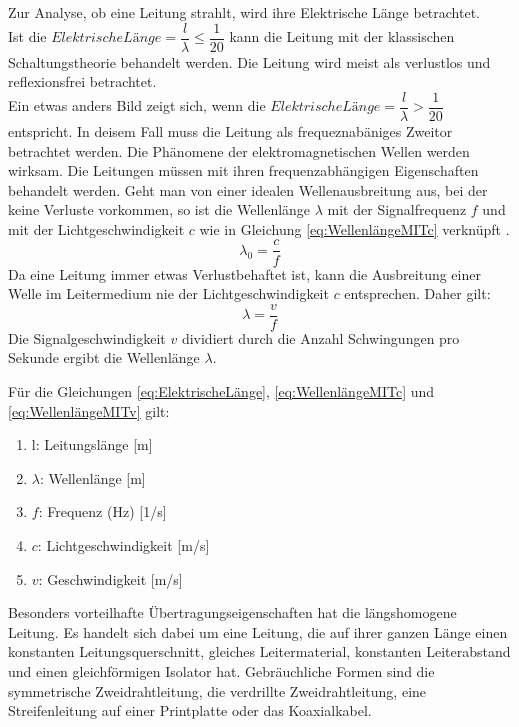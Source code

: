Zur Analyse, ob eine Leitung strahlt, wird ihre Elektrische Länge betrachtet. \\
Ist die $Elektrische Länge=\dfrac{l}{\lambda} \le \dfrac{1}{20}$  kann die Leitung mit der klassischen Schaltungstheorie behandelt werden. Die Leitung wird meist als verlustlos und reflexionsfrei betrachtet.\\
Ein etwas anders Bild zeigt sich, wenn die $Elektrische Länge=\dfrac{l}{\lambda}>\dfrac{1}{20}$ entspricht. In deisem Fall muss die Leitung als frequeznabäniges Zweitor betrachtet werden. Die Phänomene der elektromagnetischen Wellen werden wirksam. Die Leitungen müssen mit ihren frequenzabhängigen Eigenschaften behandelt werden. 
Geht man von einer idealen Wellenausbreitung aus, bei der keine Verluste vorkommen, so ist die Wellenlänge $\lambda$ mit der Signalfrequenz $f$ und mit der Lichtgeschwindigkeit $c$ wie in Gleichung \ref{eq:WellenlängeMITc} verknüpft \cite{Tekom}.
\begin{equation}
\lambda_{0}=\dfrac{c}{f}\label{eq:WellenlängeMITc}
\end{equation}
Da eine Leitung immer etwas Verlustbehaftet ist, kann die Ausbreitung einer Welle im Leitermedium nie der Lichtgeschwindigkeit $c$ entsprechen. Daher gilt:
\begin{equation}
\lambda=\dfrac{v}{f}\label{eq:WellenlängeMITv}
\end{equation}
Die Signalgeschwindigkeit $v$ dividiert durch die Anzahl Schwingungen pro Sekunde ergibt die Wellenlänge $\lambda$.

Für die Gleichungen \ref{eq:ElektrischeLänge}, \ref{eq:WellenlängeMITc} und \ref{eq:WellenlängeMITv} gilt:
\begin{enumerate}[leftmargin=2cm]
   \item[] l: Leitungslänge [m] 
   \item[] $\lambda$: Wellenlänge  [m] 
   \item[] $f$: Frequenz (Hz) [1/s] 
   \item[] $c$: Lichtgeschwindigkeit  [m/s] 
   \item[] $v$: Geschwindigkeit  [m/s] 
\end{enumerate} 
Besonders vorteilhafte Übertragungseigenschaften hat die längshomogene Leitung. Es handelt sich dabei um eine Leitung, die auf ihrer ganzen Länge einen konstanten Leitungsquerschnitt, gleiches
Leitermaterial, konstanten Leiterabstand und einen gleichförmigen Isolator hat. Gebräuchliche Formen sind die symmetrische Zweidrahtleitung, die verdrillte Zweidrahtleitung, eine Streifenleitung auf
einer Printplatte oder das Koaxialkabel.
